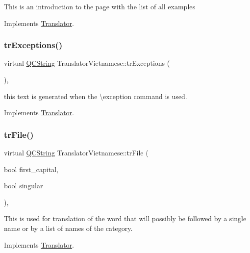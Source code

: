 This is an introduction to the page with the list of all examples 

Implements \mbox{\hyperlink{class_translator}{Translator}}.

\mbox{\label{class_translator_vietnamese_ab4b59788541117f953b1ac9cdb84cdae}} 
\subsubsection{\texorpdfstring{trExceptions()}{trExceptions()}}
{\footnotesize\ttfamily virtual \mbox{\hyperlink{class_q_c_string}{Q\+C\+String}} Translator\+Vietnamese\+::tr\+Exceptions (\begin{DoxyParamCaption}{ }\end{DoxyParamCaption})\hspace{0.3cm}{\ttfamily [inline]}, {\ttfamily [virtual]}}

this text is generated when the \textbackslash{}exception command is used. 

Implements \mbox{\hyperlink{class_translator}{Translator}}.

\mbox{\label{class_translator_vietnamese_a9f90535888f432a0079053c1a1d9c39c}} 
\subsubsection{\texorpdfstring{trFile()}{trFile()}}
{\footnotesize\ttfamily virtual \mbox{\hyperlink{class_q_c_string}{Q\+C\+String}} Translator\+Vietnamese\+::tr\+File (\begin{DoxyParamCaption}\item[{bool}]{first\+\_\+capital,  }\item[{bool}]{singular }\end{DoxyParamCaption})\hspace{0.3cm}{\ttfamily [inline]}, {\ttfamily [virtual]}}

This is used for translation of the word that will possibly be followed by a single name or by a list of names of the category. 

Implements \mbox{\hyperlink{class_translator}{Translator}}.

